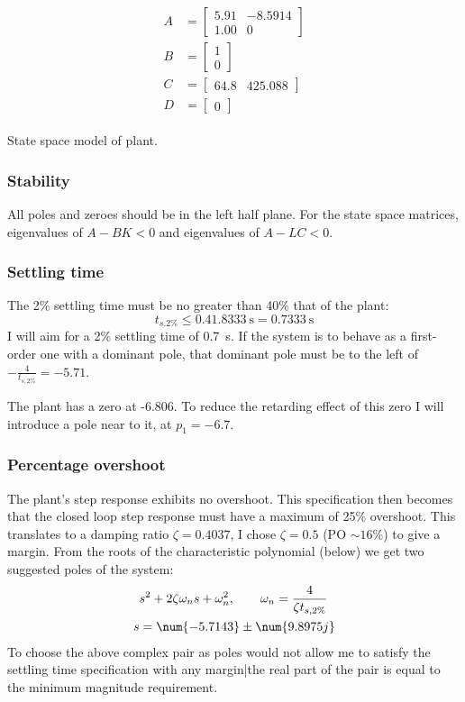 \problem

\begin{captioneq}
	\centering
	\begin{align}
		\begin{split}
			A &=\begin{bmatrix}
				5.91  &-8.5914\\
				1.00  &                 0
			\end{bmatrix}\\
			B &=\begin{bmatrix}
				1\\0
			\end{bmatrix}\\
			C &= \begin{bmatrix}
				64.8 & 425.088
			\end{bmatrix}\\
			D &= \begin{bmatrix}
				0
			\end{bmatrix}
	\end{split}
	\end{align}
	\caption{State space model of plant.}
\end{captioneq}

\subsubsection*{Stability}
All poles and zeroes should be in the left half plane. For the state space matrices, eigenvalues of $A-BK<0$ and eigenvalues of $A-LC<0$.
\subsubsection*{Settling time}
The 2\% settling time must be no greater than 40\% that of the plant:
$$
t_{s.2\%} \leq 0.4 \SI{1.8333}{\second} = \SI{0.7333}{\second}
$$
I will aim for a 2\% settling time of \SI{0.7}{\second}. If the system is to behave as a first-order one with a dominant pole, that dominant pole must be to the left of $-\frac{4}{t_{s,2\%}}=-5.71$.

The plant has a zero at -6.806. To reduce the retarding effect of this zero I will introduce a pole near to it, at $p_1=-6.7$.

\subsubsection*{Percentage overshoot}
The plant's step response exhibits no overshoot. This specification then becomes that the closed loop step response must have a maximum of 25\% overshoot. This translates to a damping ratio $\zeta=0.4037$, I chose $\zeta=0.5$ (PO $\sim 16\%$) to give a margin. From the roots of the characteristic polynomial (below) we get two suggested poles of the system:
\begin{align*}
	&s^2+2\zeta \omega_n s + \omega_n^2,\qquad\omega_n=\frac{4}{\zeta t_{s,2\%}}\\
	s&=\num{-5.7143}\pm\num{9.8975j}
\end{align*}
To choose the above complex pair as poles would not allow me to satisfy the settling time specification with any margin|the real part of the pair is equal to the minimum magnitude requirement.

